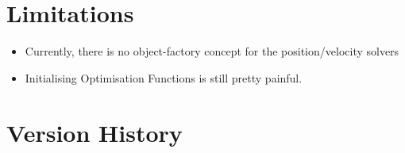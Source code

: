 \documentclass[12pt,a4paper,onecolumn]{article}
\begin{document}

\newpage
\appendix
\section{Limitations}
\begin{itemize}
\item Currently, there is no object-factory concept for the position/velocity solvers
\item Initialising Optimisation Functions is still pretty painful.
\end{itemize}
\section{Version History}
\end{document}
